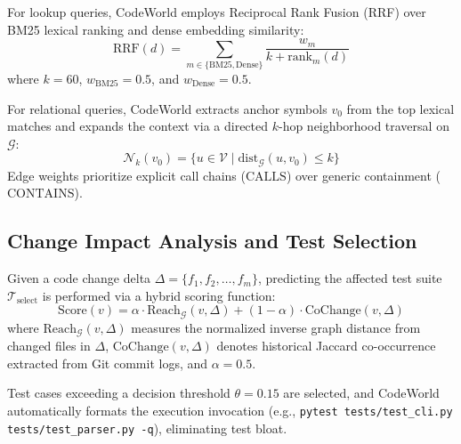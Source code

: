 \documentclass[conference]{IEEEtran}
\begin{document}
For lookup queries, CodeWorld employs Reciprocal Rank Fusion (RRF) over BM25 lexical ranking and dense embedding similarity:
\begin{equation}
\text{RRF}(d) = \sum_{m \in \{\text{BM25}, \text{Dense}\}} \frac{w_m}{k + \text{rank}_m(d)}
\end{equation}
where $k = 60$, $w_{\text{BM25}} = 0.5$, and $w_{\text{Dense}} = 0.5$.

For relational queries, CodeWorld extracts anchor symbols $v_0$ from the top lexical matches and expands the context via a directed $k$-hop neighborhood traversal on $\mathcal{G}$:
\begin{equation}
\mathcal{N}_k(v_0) = \{ u \in \mathcal{V} \mid \text{dist}_{\mathcal{G}}(u, v_0) \le k \}
\end{equation}
Edge weights prioritize explicit call chains ($\text{CALLS}$) over generic containment ($\text{CONTAINS}$).

\subsection{Change Impact Analysis and Test Selection}
Given a code change delta $\Delta = \{f_1, f_2, \dots, f_m\}$, predicting the affected test suite $\mathcal{T}_{\text{select}}$ is performed via a hybrid scoring function:
\begin{equation}
\label{eq:impact}
\text{Score}(v) = \alpha \cdot \text{Reach}_{\mathcal{G}}(v, \Delta) + (1 - \alpha) \cdot \text{CoChange}(v, \Delta)
\end{equation}
where $\text{Reach}_{\mathcal{G}}(v, \Delta)$ measures the normalized inverse graph distance from changed files in $\Delta$, $\text{CoChange}(v, \Delta)$ denotes historical Jaccard co-occurrence extracted from Git commit logs, and $\alpha = 0.5$.

Test cases exceeding a decision threshold $\theta = 0.15$ are selected, and CodeWorld automatically formats the execution invocation (e.g., \texttt{pytest tests/test\_cli.py tests/test\_parser.py -q}), eliminating test bloat.
\end{document}
